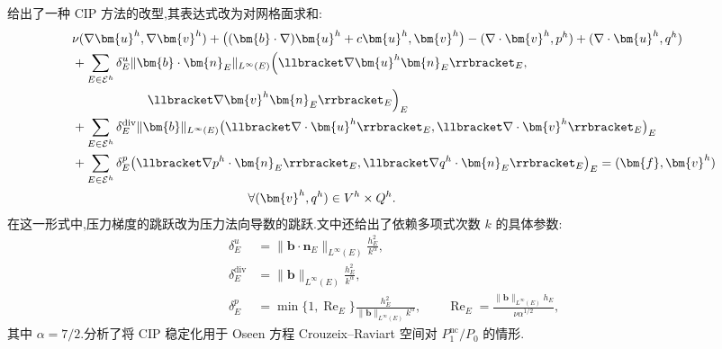 \begin{note}
\textcite{BraackBurmanJohnLube2007}给出了一种 CIP 方法的改型,其表达式改为对网格面求和:
\begin{equation}\label{eq:oseen-cip-face-form}
\begin{aligned}
 &\nu(\nabla\bm{u}^h,\nabla\bm{v}^h)
   +\bigl((\bm{b}\cdot\nabla)\bm{u}^h+c\bm{u}^h,
          \bm{v}^h\bigr)
   -(\nabla\cdot\bm{v}^h,p^h)
   +(\nabla\cdot\bm{u}^h,q^h)\\
 &+\sum_{E\in\mathcal{E}^h}
      \delta_E^u\|\bm{b}\cdot\bm{n}_E\|_{L^\infty(E)}
      \Bigl(\llbracket\nabla\bm{u}^h\bm{n}_E\rrbracket_E,\\
 &\hspace{6em}\llbracket\nabla\bm{v}^h\bm{n}_E\rrbracket_E\Bigr)_E\\
 &+\sum_{E\in\mathcal{E}^h}
      \delta_E^{\mathrm{div}}\|\bm{b}\|_{L^\infty(E)}
      \bigl(\llbracket\nabla\cdot\bm{u}^h\rrbracket_E,
            \llbracket\nabla\cdot\bm{v}^h\rrbracket_E\bigr)_E\\
 &+\sum_{E\in\mathcal{E}^h}\delta_E^p
      \bigl(\llbracket\nabla p^h\cdot\bm{n}_E\rrbracket_E,
            \llbracket\nabla q^h\cdot\bm{n}_E\rrbracket_E\bigr)_E
   =(\bm{f},\bm{v}^h)\\
 &\hspace{14em}\forall(\bm{v}^h,q^h)\in V^h\times Q^h.
\end{aligned}
\end{equation}
在这一形式中,压力梯度的跳跃改为压力法向导数的跳跃.文中还给出了依赖多项式次数 $k$ 的具体参数:
\begin{equation}\label{eq:oseen-cip-parameters}
\begin{aligned}
 \delta_E^u&=\|\bm{b}\cdot\bm{n}_E\|_{L^\infty(E)}
              \frac{h_E^2}{k^\alpha},\\
 \delta_E^{\mathrm{div}}&=\|\bm{b}\|_{L^\infty(E)}
              \frac{h_E^2}{k^\alpha},\\
 \delta_E^p&=\min\{1,\operatorname{Re}_E\}
              \frac{h_E^2}{\|\bm{b}\|_{L^\infty(E)}k^\alpha},
 \qquad
 \operatorname{Re}_E=
   \frac{\|\bm{b}\|_{L^\infty(E)}h_E}{\nu\alpha^{1/2}},
\end{aligned}
\end{equation}
其中 $\alpha=7/2$.\textcite{BurmanHansbo2006}分析了将 CIP 稳定化用于 Oseen 方程 Crouzeix--Raviart 空间对 $P_1^{\mathrm{nc}}/P_0$ 的情形.
\end{note}

